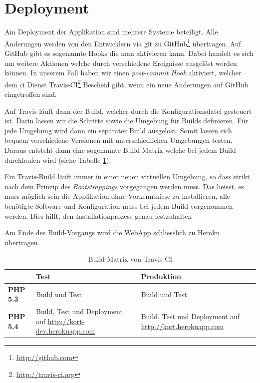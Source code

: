\section{Deployment}
Am Deployment der Applikation sind mehrere Systeme beteiligt. 
Alle Änderungen werden von den Entwicklern via \gls{git} zu GitHub\footnote{\url{http://github.com}} übertragen. 
Auf GitHub gibt es sogenannte Hooks die man aktivieren kann. 
Dabei handelt es sich um weitere Aktionen welche durch verschiedene Ereignisse ausgelöst werden können. 
In unserem Fall haben wir einen \emph{post-commit Hook} aktiviert, welcher dem \gls{ci} Dienst Travis-CI\footnote{\url{http://travis-ci.org}} Bescheid gibt, wenn ein neue Änderungen auf GitHub eingetroffen sind.

Auf Travis läuft dann der Build, welcher durch die Konfigurationsdatei  gesteuert ist. Darin lassen wir die Schritte sowie die Umgebung für Builds definieren. Für jede Umgebung wird dann ein separater Build ausgelöst. Somit lassen sich bequem verschiedene Versionen mit unterschiedlichen Umgebungen testen.
Daraus entsteht dann eine sogenannte Build-Matrix welche bei jedem Build durchlaufen wird (siehe Tabelle \ref{infrastruktur-build-matrix}).

Ein Travis-Build läuft immer in einer neuen virtuellen Umgebung, so dass strikt nach dem Prinzip des \emph{\gls{Bootstrapping}s} vorgegangen werden muss. Das heisst, es muss möglich sein die Applikation ohne Vorkenntnisse zu installieren, alle benötigte Software und Konfiguration muss bei jedem Build vorgenommen werden.
Dies hilft, den Installationprozess genau festzuhalten

Am Ende des Build-Vorgangs wird die \gls{WebApp} schliesslich zu Heroku übertragen. 

\begin{table}[H]
\centering
\begin{tabular}{|p{0.2\threecelltabwidth}|p{0.4\threecelltabwidth}|p{0.4\threecelltabwidth}|}
\hline 
 & \textbf{Test} & \textbf{Produktion} \\
\hline 
\textbf{PHP 5.3} & Build und Test & Build und Test \\
\hline 
\textbf{PHP 5.4} & Build, Test und Deployment auf \url{http://kort-dev.herokuapp.com} & Build, Test und Deployment auf \url{http://kort.herokuapp.com} \\
\hline 
\end{tabular} 
\caption{Build-Matrix von Travis CI}
\label{infrastruktur-build-matrix}
\end{table}

